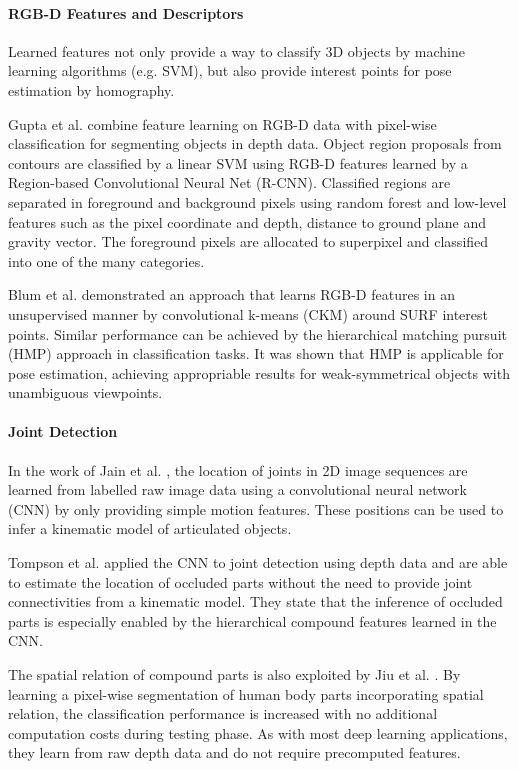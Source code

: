 \paragraph{RGB-D Features and Descriptors}
Learned features not only provide a way to classify 3D objects by machine learning algorithms (e.g. SVM), but also provide interest points for pose estimation by homography.

Gupta et al. \cite{Gupta2014} combine feature learning on RGB-D data with pixel-wise classification for segmenting objects in depth data. Object region proposals from contours are classified by a linear SVM using RGB-D features learned by a Region-based Convolutional Neural Net (R-CNN). Classified regions are separated in foreground and background pixels using random forest and low-level features such as the pixel coordinate and depth, distance to ground plane and gravity vector. The foreground pixels are allocated to superpixel and classified into one of the many categories.

Blum et al. \cite{Blum2012} demonstrated an approach that learns RGB-D features in an unsupervised manner by convolutional k-means (CKM) around SURF interest points. Similar performance can be achieved by the hierarchical matching pursuit (HMP) approach \cite{Bo2013} in classification tasks. It was shown that HMP is applicable for pose estimation, achieving appropriable results for weak-symmetrical objects with unambiguous viewpoints.

\paragraph{Joint Detection}
In the work of Jain et al. \cite{Jain2015}, the location of joints in 2D image sequences are learned from labelled raw image data using a convolutional neural network (CNN) by only providing simple motion features. These positions can be used to infer a kinematic model of articulated objects.

Tompson et al. \cite{Tompson2014} applied the CNN to joint detection using depth data and are able to estimate the location of occluded parts without the need to provide joint connectivities from a kinematic model. They state that the inference of occluded parts is especially enabled by the hierarchical compound features learned in the CNN.

The spatial relation of compound parts is also exploited by Jiu et al. \cite{Jiu2014}. By learning a pixel-wise segmentation of human body parts incorporating spatial relation, the classification performance is increased with no additional computation costs during testing phase. As with most deep learning applications, they learn from raw depth data and do not require precomputed features.



